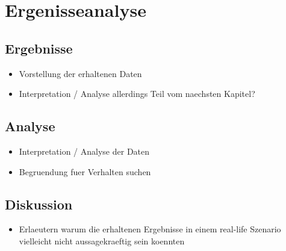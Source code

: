 \chapter{Ergenisseanalyse}

\section{Ergebnisse}
\begin{itemize}
  \item Vorstellung der erhaltenen Daten
  \item Interpretation / Analyse allerdings Teil vom naechsten Kapitel?
\end{itemize}

\section{Analyse}
\begin{itemize}
  \item Interpretation / Analyse der Daten
  \item Begruendung fuer Verhalten suchen
\end{itemize}

\section{Diskussion}
\begin{itemize}
  \item Erlaeutern warum die erhaltenen Ergebnisse in einem real-life Szenario vielleicht nicht aussagekraeftig sein koennten
\end{itemize}
